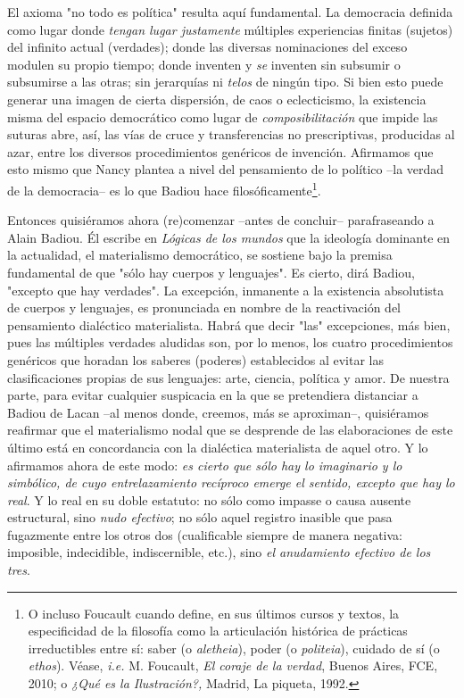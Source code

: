\documentclass{book}
\begin{document}
El axioma "no todo es política" resulta aquí fundamental. La democracia
definida como lugar donde \emph{tengan lugar justamente} múltiples
experiencias finitas (sujetos) del infinito actual (verdades); donde las
diversas nominaciones del exceso modulen su propio tiempo; donde
inventen y \emph{se} inventen sin subsumir o subsumirse a las otras; sin
jerarquías ni \emph{telos} de ningún tipo. Si bien esto puede generar
una imagen de cierta dispersión, de caos o eclecticismo, la existencia
misma del espacio democrático como lugar de \emph{composibilitación} que
impide las suturas abre, así, las vías de cruce y transferencias no
prescriptivas, producidas al azar, entre los diversos procedimientos
genéricos de invención. Afirmamos que esto mismo que Nancy plantea a
nivel del pensamiento de lo político --la verdad de la democracia-- es
lo que Badiou hace filosóficamente\footnote{O incluso Foucault cuando
  define, en sus últimos cursos y textos, la especificidad de la
  filosofía como la articulación histórica de prácticas irreductibles
  entre sí: saber (o \emph{aletheia}), poder (o \emph{politeia}),
  cuidado de sí (o \emph{ethos}). Véase, \emph{i.e.} M. Foucault,
  \emph{El coraje de la verdad}, Buenos Aires, FCE, 2010; o \emph{¿Qué
  es la Ilustración?,} Madrid, La piqueta, 1992.}.

Entonces quisiéramos ahora (re)comenzar --antes de concluir--
parafraseando a Alain Badiou. Él escribe en \emph{Lógicas de los mundos}
que la ideología dominante en la actualidad, el materialismo
democrático, se sostiene bajo la premisa fundamental de que "sólo hay
cuerpos y lenguajes". Es cierto, dirá Badiou, "excepto que hay
verdades". La excepción, inmanente a la existencia absolutista de
cuerpos y lenguajes, es pronunciada en nombre de la reactivación del
pensamiento dialéctico materialista. Habrá que decir "las" excepciones,
más bien, pues las múltiples verdades aludidas son, por lo menos, los
cuatro procedimientos genéricos que horadan los saberes (poderes)
establecidos al evitar las clasificaciones propias de sus lenguajes:
arte, ciencia, política y amor. De nuestra parte, para evitar cualquier
suspicacia en la que se pretendiera distanciar a Badiou de Lacan --al
menos donde, creemos, más se aproximan--, quisiéramos reafirmar que el
materialismo nodal que se desprende de las elaboraciones de este último
está en concordancia con la dialéctica materialista de aquel otro. Y lo
afirmamos ahora de este modo: \emph{es cierto que sólo hay lo imaginario
y lo simbólico, de cuyo entrelazamiento recíproco emerge el sentido,
excepto que hay lo real}. Y lo real en su doble estatuto: no sólo como
impasse o causa ausente estructural, sino \emph{nudo efectivo}; no sólo
aquel registro inasible que pasa fugazmente entre los otros dos
(cualificable siempre de manera negativa: imposible, indecidible,
indiscernible, etc.), sino \emph{el anudamiento efectivo de los tres}.
\end{document}
